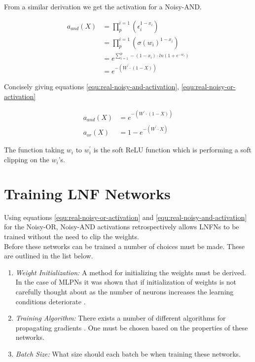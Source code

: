 From a similar derivation we get the activation for a Noisy-AND.

\begin{align*}
a_{and}(X) &= \prod_{p}^{i=1} (\epsilon_i^{1 - x_i})\\
&= \prod_{p}^{i=1} (\sigma(w_i)^{1 - x_i})\\
&= e^{\sum^p_{i=1} -(1 - x_i) \cdot ln(1 + e^{-w_i})}\\
&= e^{-(W^{'} \cdot (1 - X))}
\end{align*}

Concisely giving equations \ref{equ:real-noisy-and-activation}, \ref{equ:real-noisy-or-activation}

\begin{align}
a_{and}(X) &= e^{-(W^{'} \cdot (1 - X))} \label{equ:real-noisy-and-activation}\\
a_{or}(X)&= 1 - e^{-(W^{'} \cdot X)} \label{equ:real-noisy-or-activation}
\end{align}

The function taking $w_i$ to $w_i^{'}$ is the soft ReLU function which is performing a soft clipping on the $w_i$'s. 

\section{Training LNF Networks}
Using equations \ref{equ:real-noisy-or-activation} and \ref{equ:real-noisy-and-activation} for the Noisy-OR, Noisy-AND activations retrospectively allows LNFNs to be trained without the need to clip the weights.\\

Before these networks can be trained a number of choices must be made. These are outlined in the list below.

\begin{enumerate}
	\item \textit{Weight Initialization:} A method for initializing the weights must be derived. In the case of MLPNs it was shown that if initialization of weights is not carefully thought about as the number of neurons increases the learning conditions deteriorate \cite{glorot2010understanding}.
	\item \textit{Training Algorithm:} There exists a number of different algorithms for propagating gradients \cite{ruder2016overview}. One must be chosen based on the properties of these networks.
	\item \textit{Batch Size:} What size should each batch be when training these networks.
\end{enumerate}


